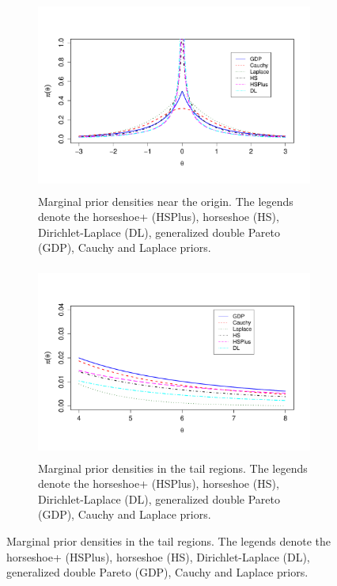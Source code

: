 \documentclass[11pt]{article}
\begin{document}
\begin{figure}[ht!]
  \begin{subfigure}{0.45\linewidth}
	\includegraphics[height=2.5in,width=\textwidth]{densities_zero_new}%
	\caption{\footnotesize{Marginal prior densities near the origin. The legends denote the horseshoe+ (HSPlus), horseshoe (HS), Dirichlet-Laplace (DL), generalized double Pareto (GDP), Cauchy and Laplace priors.}}
	\label{fig:zero}
	\end{subfigure}
	\hspace{0.1in}
  \begin{subfigure}{0.45\linewidth}
	\includegraphics[height=2.5in,width=\textwidth]{densities_tails_new}
 	 \caption{\footnotesize{Marginal prior densities in the tail regions. The legends denote the horseshoe+ (HSPlus), horseshoe (HS), Dirichlet-Laplace (DL), generalized double Pareto (GDP), Cauchy and Laplace priors.}}
  \label{fig:tails}
		\end{subfigure}
\end{figure}
\end{document}

